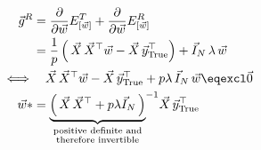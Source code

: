 \begin{frame}
\begin{align}
\vec g^R 
&= \frac{\partial}{\partial \vec w} E^T_{[\vec w]} + \frac{\partial}{\partial \vec w} E^R_{[\vec w]}\\
&= \frac{1}{p} \left(\, \vec X \, \vec X^\top \vec w - \vec X\, \vec y_{\text{True}}^\top \right) + \vec I_N \, \lambda \, \vec w\\
\iff& \quad \vec X \, \vec X^\top \vec w - \vec X\, \vec y_{\text{True}}^\top + p \lambda \, \vec I_N \,  \vec w \eqexcl \vec 0\\
\vec w* &=  {\underbrace{
\left(\, \vec X \, \vec X^\top + p \lambda \vec I_N \,  \right)
}_{
\substack{
\text{positive definite and}\\
\text{therefore invertible}\\
}
}
}^{-1} \vec X \, \vec y_{\mathrm{True}}^{\top}
\end{align}

\end{frame}
